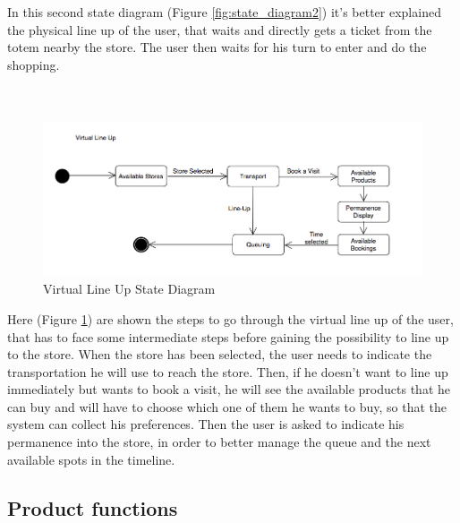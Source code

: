 \documentclass[]{article}
\begin{document}
		
		In this second state diagram (Figure \ref{fig:state_diagram2}) it’s better explained the physical line up of the user, that waits and directly gets a ticket from the totem nearby the store. The user then waits for his turn to enter and do the shopping.\\
		
		\textbf{}\\ \newline
		\textbf{}\\ \newline
		
		\begin{figure}[H]
			\centering
			\includegraphics[width=\linewidth]{VirtualLineUp_statediagram.png}
			\caption{Virtual Line Up State Diagram}
			\label{fig:state_diagram3}
		\end{figure}
		
		Here (Figure \ref{fig:state_diagram3})  are shown the steps to go through the virtual line up of the user, that has to face some intermediate steps before gaining the possibility to line up to the store. When the store has been selected, the user needs to indicate the transportation he will use to reach the store. Then, if he doesn't want to line up immediately but wants to book a visit, he will see the available products that he can buy and will have to choose which one of them he wants to buy, so that the system can collect his preferences. Then the user is asked to indicate his permanence into the store, in order to better manage the queue and the next available spots in the timeline. \\
		

\newpage

\subsection{Product functions}
\end{document}
